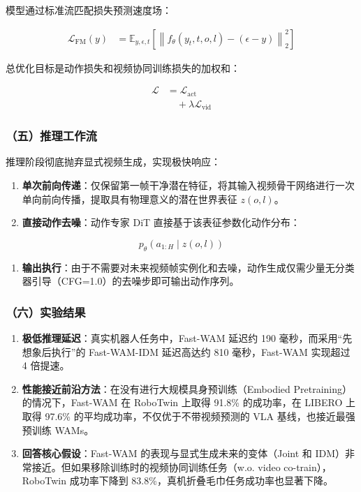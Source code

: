 模型通过标准流匹配损失预测速度场：

\[
\begin{aligned}
\mathcal{L}_{\mathrm{FM}}(y)
&= \mathbb{E}_{y,\epsilon,t}
\left[
\left\|
f_\theta(y_t,t,o,l) - (\epsilon-y)
\right\|_2^2
\right]
\end{aligned}
\]

总优化目标是动作损失和视频协同训练损失的加权和：

\[
\begin{aligned}
\mathcal{L}
&= \mathcal{L}_{\mathrm{act}}
\\
&\quad + \lambda \mathcal{L}_{\mathrm{vid}}
\end{aligned}
\]

\hypertarget{ux4e94ux63a8ux7406ux5de5ux4f5cux6d41-1}{%
\subsubsection{（五）推理工作流}\label{ux4e94ux63a8ux7406ux5de5ux4f5cux6d41-1}}

推理阶段彻底抛弃显式视频生成，实现极快响应：

\begin{enumerate}
\def\labelenumi{\arabic{enumi}.}
\tightlist
\item
  \textbf{单次前向传递}：仅保留第一帧干净潜在特征，将其输入视频骨干网络进行一次单向前向传播，提取具有物理意义的潜在世界表征 \(z(o,l)\)。
\item
  \textbf{直接动作去噪}：动作专家 DiT 直接基于该表征参数化动作分布：
\end{enumerate}

\[
p_\theta(a_{1:H}\mid z(o,l))
\]

\begin{enumerate}
\def\labelenumi{\arabic{enumi}.}
\setcounter{enumi}{2}
\tightlist
\item
  \textbf{输出执行}：由于不需要对未来视频帧实例化和去噪，动作生成仅需少量无分类器引导（CFG=1.0）的去噪步即可输出动作序列。
\end{enumerate}

\hypertarget{ux516dux5b9eux9a8cux7ed3ux679c}{%
\subsubsection{（六）实验结果}\label{ux516dux5b9eux9a8cux7ed3ux679c}}

\begin{enumerate}
\def\labelenumi{\arabic{enumi}.}
\tightlist
\item
  \textbf{极低推理延迟}：真实机器人任务中，Fast-WAM 延迟约 190 毫秒，而采用``先想象后执行''的 Fast-WAM-IDM 延迟高达约 810 毫秒，Fast-WAM 实现超过 4 倍提速。
\item
  \textbf{性能接近前沿方法}：在没有进行大规模具身预训练（Embodied Pretraining）的情况下，Fast-WAM 在 RoboTwin 上取得 91.8\% 的成功率，在 LIBERO 上取得 97.6\% 的平均成功率，不仅优于不带视频预测的 VLA 基线，也接近最强预训练 WAMs。
\item
  \textbf{回答核心假设}：Fast-WAM 的表现与显式生成未来的变体（Joint 和 IDM）非常接近。但如果移除训练时的视频协同训练任务（w.o. video co-train），RoboTwin 成功率下降到 83.8\%，真机折叠毛巾任务成功率也显著下降。
\end{enumerate}

